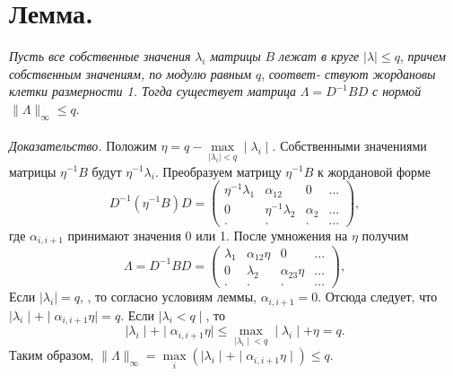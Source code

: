 \documentclass[a4paper, twoside, 12pt]{article}
\begin{document}
\chapter{\textbf{Лемма. }} \textit{Пусть все собственные значения} $\lambda_{i}$ \textit{матрицы} $B$ \textit{лежат в круге }$\mid\lambda\mid \leqslant q$, \textit{причем собственным значениям, по модулю равным} $q$, \textit{соответ- ствуют жордановы клетки размерности 1. Тогда существует матрица} $	\Lambda = D^{-1}BD$ \textit{с нормой} $\| \Lambda \|_{\infty} \leqslant q$.
\\ \\ 
\noindent \textit{Доказательство.} Положим $\eta = q - 
\max\limits_{{\mid\lambda_{i}\mid < q}}\mid\lambda_{i}\mid.
$ Собственными значениями матрицы
$\eta^{-1}B$ будут $\eta^{-1}\lambda_{i}$. Преобразуем матрицу $\eta^{-1}B$ к жордановой
форме
\[ D^{-1}(\eta^{-1}B)D=
\left(
\begin{array}{cccc}
\eta^{-1}\lambda_{1} & \alpha_{12} & 0 & ... \\
0 & \eta^{-1}\lambda_{2} & \alpha_{2} & ...\\
. & .  & . & ...
\end{array}
\right) , 
\]
где $\alpha_{i,i+1}$ принимают значения 0 или 1. После умножения на $\eta$ получим
\[ \Lambda= D^{-1}BD=
\left(
\begin{array}{cccc}
\lambda_{1} & \alpha_{12}\eta & 0 & ... \\
0 & \lambda_{2} & \alpha_{23}\eta & ...\\
. & .  & . & ...
\end{array}
\right) , 
\]
Если $\mid\lambda_{i}\mid=q$,  , то согласно условиям леммы, $\alpha_{i, i+1}= 0$.
Отсюда следует,
что $\mid \lambda_{i} \mid + \mid \alpha_{i,i+1}\eta \mid = q $. Если $\mid\lambda_{i} < q\mid$, то 
\[
\mid \lambda_{i} \mid + \mid \alpha_{i,i+1}\eta \mid
\leqslant \max\limits_{{\mid\lambda_{i}\mid} < q} \mid\lambda_{i}\mid+\eta = q.
\]
Таким образом, $\| \Lambda \| _{\infty} = \max\limits_{i} (\mid \lambda_{i} \mid + \mid \alpha_{i,i+1}\eta \mid) \leqslant q.$
\\
\end{document}
